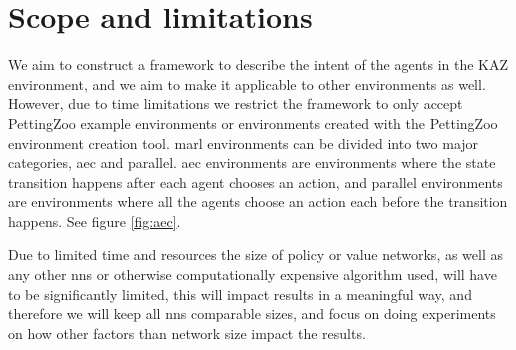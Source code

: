 \documentclass[UKenglish]{uiomasterthesis}
\begin{document}
\section{Scope and limitations}
We aim to construct a framework to describe the intent of the agents in the KAZ environment, and we aim to make it applicable to other environments as well. However, due to time limitations we restrict the framework to only accept PettingZoo example environments or environments created with the PettingZoo environment creation tool. \ac{marl} environments can be divided into two major categories, \ac{aec} and parallel. \ac{aec} environments are environments where the state transition happens after each agent chooses an action, and parallel environments are environments where all the agents choose an action each before the transition happens. See figure \ref{fig:aec}.

Due to limited time and resources the size of policy or value networks, as well as any other \acp{nn} or otherwise computationally expensive algorithm used, will have to be significantly limited, this will impact results in a meaningful way, and therefore we will keep all \acp{nn} comparable sizes, and focus on doing experiments on how other factors than network size impact the results.
\end{document}
